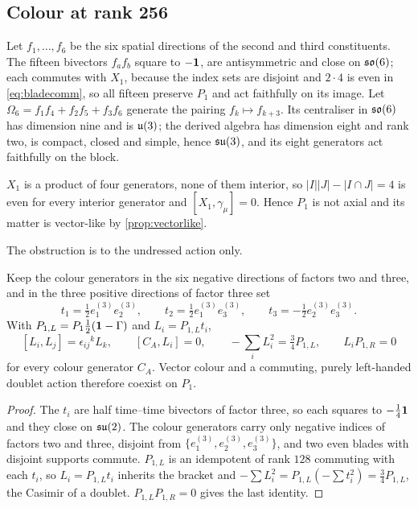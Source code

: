 \subsection{Colour at rank 256}

\begin{theorem}[Colour on $P_1$]
\label{thm:su3}
Let $f_1,\dots,f_6$ be the six spatial directions of the second and third constituents. The fifteen bivectors $f_af_b$ square to
$-\mathbf 1$, are antisymmetric and close on $\mathfrak{so}(6)$; each commutes with $X_1$, because the index sets are disjoint and $2\cdot4$ is even in
\eqref{eq:bladecomm}, so all fifteen preserve $P_1$ and act faithfully on its image. Let $\Omega_6=f_1f_4+f_2f_5+f_3f_6$ generate the pairing
$f_k\mapsto f_{k+3}$. Its centraliser in $\mathfrak{so}(6)$ has dimension nine and is $\mathfrak{u}(3)$; the derived algebra has dimension eight and rank two, is
compact, closed and simple, hence $\mathfrak{su}(3)$, and its eight generators act faithfully on the block.
\end{theorem}

\begin{theorem}
\label{thm:p1}
$X_1$ is a product of four generators, none of them interior, so $|I||J|-|I\cap J|=4$ is even for every interior generator and
$[X_1,\gamma_\mu]=0$. Hence $P_1$ is not axial and its matter is vector-like by \cref{prop:vectorlike}.
\end{theorem}

The obstruction is to the undressed action only.

\begin{theorem}
\label{thm:p1chiral}
Keep the colour generators in the six negative directions of factors two and three, and in the three positive directions of factor
three set
\[
t_1=\tfrac12e^{(3)}_1e^{(3)}_2,\qquad t_2=\tfrac12e^{(3)}_1e^{(3)}_3,\qquad t_3=-\tfrac12e^{(3)}_2e^{(3)}_3 .
\]
With $P_{1,L}=P_1\tfrac12(\mathbf 1-\Gamma)$ and $L_i=P_{1,L}t_i$,
\[
[L_i,L_j]=\epsilon_{ij}{}^kL_k,\qquad [C_A,L_i]=0,\qquad -\sum_iL_i^2=\tfrac34P_{1,L},\qquad L_iP_{1,R}=0
\]
for every colour generator $C_A$. Vector colour and a commuting, purely left-handed doublet action therefore coexist on $P_1$.
\end{theorem}

\begin{proof}
The $t_i$ are half time--time bivectors of factor three, so each squares to $-\tfrac14\mathbf 1$ and they close on $\mathfrak{su}(2)$. The colour generators
carry only negative indices of factors two and three, disjoint from $\{e^{(3)}_1,e^{(3)}_2,e^{(3)}_3\}$, and two even blades with disjoint
supports commute. $P_{1,L}$ is an idempotent of rank $128$ commuting with each $t_i$, so $L_i=P_{1,L}t_i$ inherits the bracket and
$-\sum L_i^2=P_{1,L}(-\sum t_i^2)=\tfrac34P_{1,L}$, the Casimir of a doublet. $P_{1,L}P_{1,R}=0$ gives the last identity.
\end{proof}

